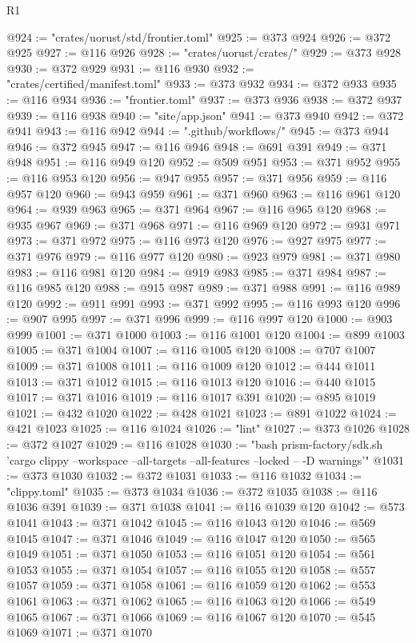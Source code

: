 \begin{lexlean}{R1}
\begin{coremodule}
@924 := "crates/uorust/std/frontier.toml"
@925 := @373 @924
@926 := @372 @925
@927 := @116 @926
@928 := "crates/uorust/crates/"
@929 := @373 @928
@930 := @372 @929
@931 := @116 @930
@932 := "crates/certified/manifest.toml"
@933 := @373 @932
@934 := @372 @933
@935 := @116 @934
@936 := "frontier.toml"
@937 := @373 @936
@938 := @372 @937
@939 := @116 @938
@940 := "site/app.json"
@941 := @373 @940
@942 := @372 @941
@943 := @116 @942
@944 := ".github/workflows/"
@945 := @373 @944
@946 := @372 @945
@947 := @116 @946
@948 := @691 @391
@949 := @371 @948
@951 := @116 @949 @120
@952 := @509 @951
@953 := @371 @952
@955 := @116 @953 @120
@956 := @947 @955
@957 := @371 @956
@959 := @116 @957 @120
@960 := @943 @959
@961 := @371 @960
@963 := @116 @961 @120
@964 := @939 @963
@965 := @371 @964
@967 := @116 @965 @120
@968 := @935 @967
@969 := @371 @968
@971 := @116 @969 @120
@972 := @931 @971
@973 := @371 @972
@975 := @116 @973 @120
@976 := @927 @975
@977 := @371 @976
@979 := @116 @977 @120
@980 := @923 @979
@981 := @371 @980
@983 := @116 @981 @120
@984 := @919 @983
@985 := @371 @984
@987 := @116 @985 @120
@988 := @915 @987
@989 := @371 @988
@991 := @116 @989 @120
@992 := @911 @991
@993 := @371 @992
@995 := @116 @993 @120
@996 := @907 @995
@997 := @371 @996
@999 := @116 @997 @120
@1000 := @903 @999
@1001 := @371 @1000
@1003 := @116 @1001 @120
@1004 := @899 @1003
@1005 := @371 @1004
@1007 := @116 @1005 @120
@1008 := @707 @1007
@1009 := @371 @1008
@1011 := @116 @1009 @120
@1012 := @444 @1011
@1013 := @371 @1012
@1015 := @116 @1013 @120
@1016 := @440 @1015
@1017 := @371 @1016
@1019 := @116 @1017 @391
@1020 := @895 @1019
@1021 := @432 @1020
@1022 := @428 @1021
@1023 := @891 @1022
@1024 := @421 @1023
@1025 := @116 @1024
@1026 := "lint"
@1027 := @373 @1026
@1028 := @372 @1027
@1029 := @116 @1028
@1030 := "bash prism-factory/sdk.sh 'cargo clippy --workspace --all-targets --all-features --locked -- -D warnings'"
@1031 := @373 @1030
@1032 := @372 @1031
@1033 := @116 @1032
@1034 := "clippy.toml"
@1035 := @373 @1034
@1036 := @372 @1035
@1038 := @116 @1036 @391
@1039 := @371 @1038
@1041 := @116 @1039 @120
@1042 := @573 @1041
@1043 := @371 @1042
@1045 := @116 @1043 @120
@1046 := @569 @1045
@1047 := @371 @1046
@1049 := @116 @1047 @120
@1050 := @565 @1049
@1051 := @371 @1050
@1053 := @116 @1051 @120
@1054 := @561 @1053
@1055 := @371 @1054
@1057 := @116 @1055 @120
@1058 := @557 @1057
@1059 := @371 @1058
@1061 := @116 @1059 @120
@1062 := @553 @1061
@1063 := @371 @1062
@1065 := @116 @1063 @120
@1066 := @549 @1065
@1067 := @371 @1066
@1069 := @116 @1067 @120
@1070 := @545 @1069
@1071 := @371 @1070

\end{coremodule}
\end{lexlean}
